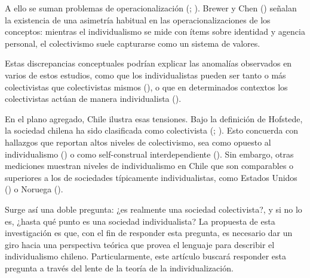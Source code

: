 \documentclass[
  letterpaper,
  DIV=11,
  numbers=noendperiod]{scrartcl}
\begin{document}
A ello se suman problemas de operacionalización
(;
). Brewer
y Chen () señalan la existencia de una
asimetría habitual en las operacionalizaciones de los conceptos:
mientras el individualismo se mide con ítems sobre identidad y agencia
personal, el colectivismo suele capturarse como un sistema de valores.

Estas discrepancias conceptuales podrían explicar las anomalías
observados en varios de estos estudios, como que los individualistas
pueden ser tanto o más colectivistas que colectivistas mismos
(), o que
en determinados contextos los colectivistas actúan de manera
individualista ().

En el plano agregado, Chile ilustra esas tensiones. Bajo la definición
de Hofstede, la sociedad chilena ha sido clasificada como colectivista
(;
). Esto concuerda con
hallazgos que reportan altos niveles de colectivismo, sea como opuesto
al individualismo () o como self-construal interdependiente
(). Sin embargo, otras
mediciones muestran niveles de individualismo en Chile que son
comparables o superiores a los de sociedades típicamente
individualistas, como Estados Unidos
() o
Noruega ().

Surge así una doble pregunta: ¿es realmente una sociedad colectivista?,
y si no lo es, ¿hasta qué punto es una sociedad individualista? La
propuesta de esta investigación es que, con el fin de responder esta
pregunta, es necesario dar un giro hacia una perspectiva teórica que
provea el lenguaje para describir el individualismo chileno.
Particularmente, este artículo buscará responder esta pregunta a través
del lente de la teoría de la individualización.
\end{document}
